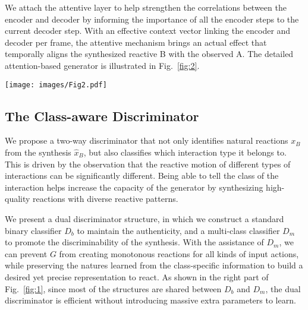 \documentclass[times,twocolumn,final]{elsarticle}
\begin{document}
We attach the attentive layer to help strengthen the correlations between the encoder and decoder by informing the importance of all the encoder steps to the current decoder step. With an effective context vector linking the encoder and decoder per frame, the attentive mechanism brings an actual effect that temporally aligns the synthesized reactive B with the observed A. The detailed attention-based generator is illustrated in Fig.~\ref{fig:2}. 

\begin{figure*}[t]
\centering\texttt{[image: images/Fig2.pdf]}
\caption{The reactive motion generator pipeline. The characters in red show example frames of real-world shaking hand and the blue characters are example frames of the synthesized reaction.}
\label{fig:2} 
\end{figure*}

\subsection{The Class-aware Discriminator}
\label{sec:3.2}

We propose a two-way discriminator that not only identifies natural reactions $x_{B}$ from the synthesis $\hat{x}_B$, but also classifies which interaction type it belongs to. This is driven by the observation that the reactive motion of different types of interactions can be significantly different. Being able to tell the class of the interaction helps increase the capacity of the generator by synthesizing high-quality reactions with diverse reactive patterns.

We present a dual discriminator structure, in which we construct a standard binary classifier $D_{b}$ to maintain the authenticity, and a multi-class classifier $D_{m}$ to promote the discriminability of the synthesis. With the assistance of $D_{m}$, we can prevent $G$ from creating monotonous reactions for all kinds of input actions, while preserving the natures learned from the class-specific information to build a desired yet precise representation to react. As shown in the right part of Fig.~\ref{fig:1}, since most of the structures are shared between $D_{b}$ and $D_{m}$, the dual discriminator is efficient without introducing massive extra parameters to learn.
\end{document}
